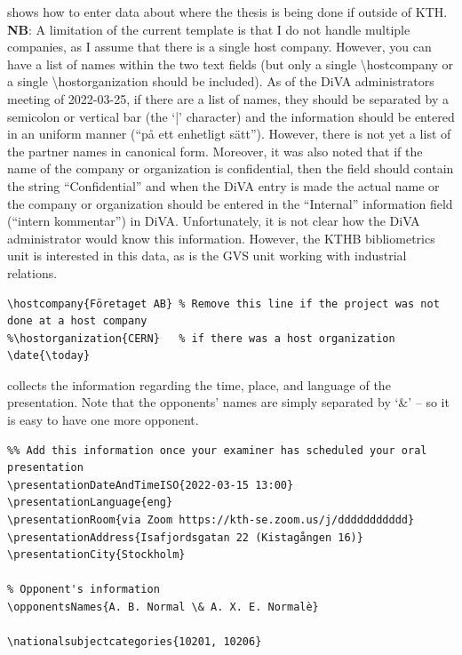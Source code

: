  shows how to enter data about where the thesis is being done if outside of KTH.
\textbf{NB}: A limitation of the current template is that I do not handle multiple companies, as I assume that there is a single host company. However, you can have a list of names within the two text fields (but only a single \textbackslash hostcompany or a single \textbackslash hostorganization should be included). As of the DiVA administrators meeting of 2022-03-25, if there are a list of names, they should be separated by a semicolon or vertical bar (\ie the `|' character) and the information should be entered in an uniform manner (\ie ``på ett enhetligt sätt''). However, there is not yet a list of the partner names in canonical form. Moreover, it was also noted that if the name of the company or organization is confidential, then the field should contain the string ``Confidential'' and when the DiVA entry is made the actual name or the company or organization should be entered in the ``Internal'' information field (\ie ``intern kommentar'') in DiVA. Unfortunately, it is not clear how the DiVA administrator would know this information. However, 
the KTHB bibliometrics unit is interested in this data, as is the GVS unit working with industrial relations.
\begin{lstlisting}[language={[LaTeX]TeX}, caption={Information about where the thesis is taking place}, label=lst:hostcompany] 
\hostcompany{Företaget AB} % Remove this line if the project was not done at a host company
%\hostorganization{CERN}   % if there was a host organization
\date{\today}
\end{lstlisting}
 collects the information regarding the time, place, and language of the presentation. Note that the opponents' names are simply separated by ‘\&’ – so it is easy to have one more opponent.
\ifxeorlua
\begin{lstlisting}[language={[LaTeX]TeX}, caption={Information relevant to the oral presentation (both the location and the opponent or opponents)}, label=lst:oralpresentatioOpponents] 
%%%%% For the oral presentation
%% Add this information once your examiner has scheduled your oral presentation
\presentationDateAndTimeISO{2022-03-15 13:00}
\presentationLanguage{eng}
\presentationRoom{via Zoom https://kth-se.zoom.us/j/ddddddddddd}
\presentationAddress{Isafjordsgatan 22 (Kistagången 16)}
\presentationCity{Stockholm}

% Opponent's information
\opponentsNames{A. B. Normal \& A. X. E. Normalè}

\nationalsubjectcategories{10201, 10206}
\end{lstlisting}
